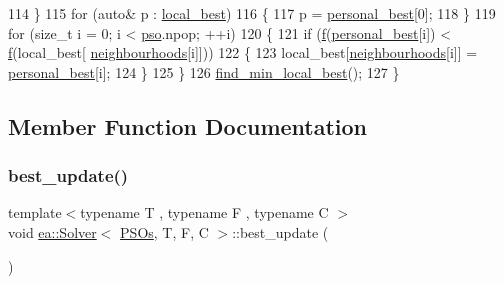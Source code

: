 \begin{DoxyCode}
114             \}
115             \textcolor{keywordflow}{for} (\textcolor{keyword}{auto}& p : \hyperlink{classea_1_1_solver_3_01_p_s_os_00_01_t_00_01_f_00_01_c_01_4_afa2eb13f0e5028ba4aa96f7e29b62e9c}{local\_best})
116             \{
117                 p = \hyperlink{classea_1_1_solver_3_01_p_s_os_00_01_t_00_01_f_00_01_c_01_4_a8a857e38363bd1ed23ea77e262b9b710}{personal\_best}[0];
118             \}
119             \textcolor{keywordflow}{for} (\textcolor{keywordtype}{size\_t} i = 0; i < \hyperlink{classea_1_1_solver_3_01_p_s_os_00_01_t_00_01_f_00_01_c_01_4_a1f1aa62756a73565ebe0ca1fbc084ea5}{pso}.npop; ++i)
120             \{
121                 \textcolor{keywordflow}{if} (\hyperlink{classea_1_1_solver__base_ae0a893780c93dfe17c1d17301de6494f}{f}(\hyperlink{classea_1_1_solver_3_01_p_s_os_00_01_t_00_01_f_00_01_c_01_4_a8a857e38363bd1ed23ea77e262b9b710}{personal\_best}[i]) < \hyperlink{classea_1_1_solver__base_ae0a893780c93dfe17c1d17301de6494f}{f}(local\_best[
      \hyperlink{classea_1_1_solver_3_01_p_s_os_00_01_t_00_01_f_00_01_c_01_4_a192926bdbed79d0cd68867c4f695cd92}{neighbourhoods}[i]]))
122                 \{
123                     local\_best[\hyperlink{classea_1_1_solver_3_01_p_s_os_00_01_t_00_01_f_00_01_c_01_4_a192926bdbed79d0cd68867c4f695cd92}{neighbourhoods}[i]] = \hyperlink{classea_1_1_solver_3_01_p_s_os_00_01_t_00_01_f_00_01_c_01_4_a8a857e38363bd1ed23ea77e262b9b710}{personal\_best}[i];
124                 \}
125             \}
126             \hyperlink{classea_1_1_solver_3_01_p_s_os_00_01_t_00_01_f_00_01_c_01_4_a012b67607139916c790167fefc1f38e7}{find\_min\_local\_best}();
127         \}
\end{DoxyCode}


\subsection{Member Function Documentation}
\mbox{\label{classea_1_1_solver_3_01_p_s_os_00_01_t_00_01_f_00_01_c_01_4_ab52c41eb3bea4aa9465ff254bee82990}} 
\subsubsection{\texorpdfstring{best\+\_\+update()}{best\_update()}}
{\footnotesize\ttfamily template$<$typename T , typename F , typename C $>$ \\
void \hyperlink{classea_1_1_solver}{ea\+::\+Solver}$<$ \hyperlink{structea_1_1_p_s_os}{P\+S\+Os}, T, F, C $>$\+::best\+\_\+update (\begin{DoxyParamCaption}{ }\end{DoxyParamCaption})\hspace{0.3cm}{\ttfamily [private]}}



